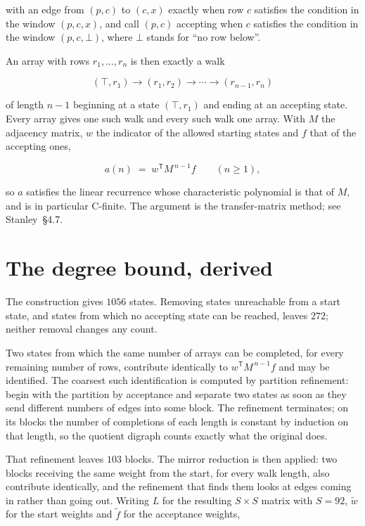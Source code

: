 \documentclass[11pt]{article}
\theoremstyle{definition}
\begin{document}
with an edge from $(p,c)$ to $(c,x)$ exactly when row $c$ satisfies the condition in the window $(p,c,x)$, and call $(p,c)$ accepting when $c$ satisfies the condition in the window $(p,c,\bot)$, where $\bot$ stands for ``no row below''.

An array with rows $r_1,\dots,r_n$ is then exactly a walk

\[(\top,r_1) \to (r_1,r_2) \to \cdots \to (r_{n-1},r_n)\]

of length $n-1$ beginning at a state $(\top,r_1)$ and ending at an accepting state. Every array gives one such walk and every such walk one array. With $M$ the adjacency matrix, $w$ the indicator of the allowed starting states and $f$ that of the accepting ones,

\[a(n) \;=\; w^{\mathsf T} M^{\,n-1} f \qquad (n \ge 1),\]

so $a$ satisfies the linear recurrence whose characteristic polynomial is that of $M$, and is in particular C-finite. The argument is the transfer-matrix method; see Stanley~\S4.7.

\section{The degree bound, derived}

The construction gives $1056$ states. Removing states unreachable from a start state, and states from which no accepting state can be reached, leaves $272$; neither removal changes any count.

Two states from which the same number of arrays can be completed, for every remaining number of rows, contribute identically to $w^{\mathsf T}M^{\,n-1}f$ and may be identified. The coarsest such identification is computed by partition refinement: begin with the partition by acceptance and separate two states as soon as they send different numbers of edges into some block. The refinement terminates; on its blocks the number of completions of each length is constant by induction on that length, so the quotient digraph counts exactly what the original does.

That refinement leaves $103$ blocks. The mirror reduction is then applied: two blocks receiving the same weight from the start, for every walk length, also contribute identically, and the refinement that finds them looks at edges coming in rather than going out. Writing $L$ for the resulting $S \times S$ matrix with $S = 92$, $\tilde w$ for the start weights and $\tilde f$ for the acceptance weights,
\end{document}

